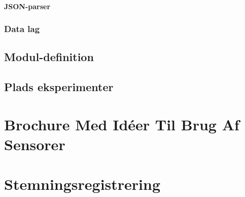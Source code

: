 \subsubsection{JSON-parser}\label{subsub:JSONparser}


\subsection{Data lag}


\section{Modul-definition}\label{modul_definition}


\section{Plads eksperimenter}\label{eksperimenter}




\label{bib:mybiblio}

\appendix



\chapter{Brochure Med Idéer Til Brug Af Sensorer}\label{app:brochure}
 

\chapter{Stemningsregistrering}\label{app:stemningsregistrering}


